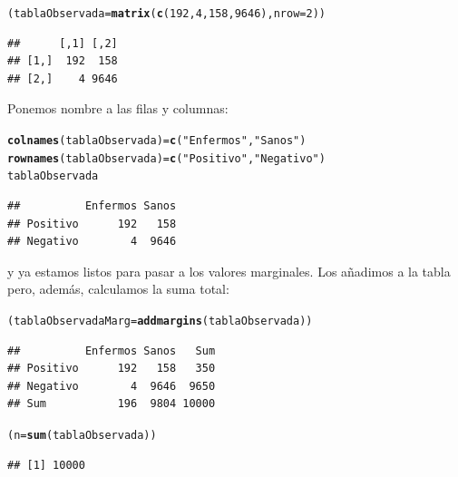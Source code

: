 \documentclass[10pt,a4paper]{article}\usepackage[]{graphicx}\usepackage[]{color}
\makeatletter
\newcommand{\hlnum}[1]{\textcolor[rgb]{0.686,0.059,0.569}{#1}}%
\newcommand{\hlstr}[1]{\textcolor[rgb]{0.192,0.494,0.8}{#1}}%
\newcommand{\hlstd}[1]{\textcolor[rgb]{0.345,0.345,0.345}{#1}}%
\newcommand{\hlkwb}[1]{\textcolor[rgb]{0.69,0.353,0.396}{#1}}%
\newcommand{\hlkwc}[1]{\textcolor[rgb]{0.333,0.667,0.333}{#1}}%
\newcommand{\hlkwd}[1]{\textcolor[rgb]{0.737,0.353,0.396}{\textbf{#1}}}%
\newenvironment{kframe}{%
 \def\at@end@of@kframe{}%
 \ifinner\ifhmode%
  \def\at@end@of@kframe{\end{minipage}}%
  \begin{minipage}{\columnwidth}%
 \fi\fi%
 \def\FrameCommand##1{\hskip\@totalleftmargin \hskip-\fboxsep
 \colorbox{shadecolor}{##1}\hskip-\fboxsep
     \hskip-\linewidth \hskip-\@totalleftmargin \hskip\columnwidth}%
 \MakeFramed {\advance\hsize-\width
   \@totalleftmargin\z@ \linewidth\hsize
   \@setminipage}}%
 {\par\unskip\endMakeFramed%
 \at@end@of@kframe}
\newenvironment{knitrout}{}{} %
\makeatother
\begin{document}
\begin{knitrout}
\color{fgcolor}\begin{kframe}
\begin{alltt}
\hlstd{(tablaObservada} \hlkwb{=} \hlkwd{matrix}\hlstd{(} \hlkwd{c}\hlstd{(}\hlnum{192}\hlstd{,} \hlnum{4}\hlstd{,} \hlnum{158}\hlstd{,} \hlnum{9646}\hlstd{),}  \hlkwc{nrow}\hlstd{=} \hlnum{2}\hlstd{))}
\end{alltt}
\begin{verbatim}
##      [,1] [,2]
## [1,]  192  158
## [2,]    4 9646
\end{verbatim}
\end{kframe}
\end{knitrout}

Ponemos nombre a las filas y columnas:

\begin{knitrout}
\color{fgcolor}\begin{kframe}
\begin{alltt}
\hlkwd{colnames}\hlstd{(tablaObservada)} \hlkwb{=} \hlkwd{c}\hlstd{(}\hlstr{"Enfermos"}\hlstd{,} \hlstr{"Sanos"}\hlstd{)}
\hlkwd{rownames}\hlstd{(tablaObservada)} \hlkwb{=} \hlkwd{c}\hlstd{(}\hlstr{"Positivo"}\hlstd{,} \hlstr{"Negativo"} \hlstd{)}
\hlstd{tablaObservada}
\end{alltt}
\begin{verbatim}
##          Enfermos Sanos
## Positivo      192   158
## Negativo        4  9646
\end{verbatim}
\end{kframe}
\end{knitrout}

y ya estamos listos para pasar a los valores marginales. Los añadimos a la tabla pero, además, calculamos la suma total:

\begin{knitrout}
\color{fgcolor}\begin{kframe}
\begin{alltt}
\hlstd{(tablaObservadaMarg} \hlkwb{=} \hlkwd{addmargins}\hlstd{(tablaObservada))}
\end{alltt}
\begin{verbatim}
##          Enfermos Sanos   Sum
## Positivo      192   158   350
## Negativo        4  9646  9650
## Sum           196  9804 10000
\end{verbatim}
\begin{alltt}
\hlstd{(n} \hlkwb{=} \hlkwd{sum}\hlstd{(tablaObservada) )}
\end{alltt}
\begin{verbatim}
## [1] 10000
\end{verbatim}
\end{kframe}
\end{knitrout}
\end{document}
